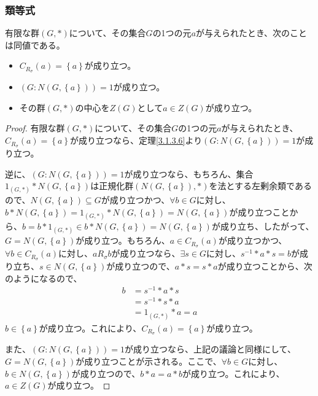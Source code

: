 \documentclass[dvipdfmx]{jsarticle}
\begin{document}
\subsubsection{類等式}%
\begin{thm}\label{3.1.3.7}
有限な群$(G,*)$について、その集合$G$の1つの元$a$が与えられたとき、次のことは同値である。
\begin{itemize}
\item
  $C_{R_{\sigma}}(a) = \left\{ a \right\}$が成り立つ。
\item
  $\left( G:N\left( G,\left\{ a \right\} \right) \right) = 1$が成り立つ。
\item
  その群$(G,*)$の中心を$Z(G)$として$a \in Z(G)$が成り立つ。
\end{itemize}
\end{thm}
\begin{proof}
有限な群$(G,*)$について、その集合$G$の1つの元$a$が与えられたとき、$C_{R_{\sigma}}(a) = \left\{ a \right\}$が成り立つなら、定理\ref{3.1.3.6}より$\left( G:N\left( G,\left\{ a \right\} \right) \right) = 1$が成り立つ。\par
逆に、$\left( G:N\left( G,\left\{ a \right\} \right) \right) = 1$が成り立つなら、もちろん、集合$1_{(G,*)}*N\left( G,\left\{ a \right\} \right)$は正規化群$\left( N\left( G,\left\{ a \right\} \right),* \right)$を法とする左剰余類であるので、$N\left( G,\left\{ a \right\} \right) \subseteq G$が成り立つかつ、$\forall b \in G$に対し、$b*N\left( G,\left\{ a \right\} \right) = 1_{(G,*)}*N\left( G,\left\{ a \right\} \right) = N\left( G,\left\{ a \right\} \right)$が成り立つことから、$b = b*1_{(G,*)} \in b*N\left( G,\left\{ a \right\} \right) = N\left( G,\left\{ a \right\} \right)$が成り立ち、したがって、$G = N\left( G,\left\{ a \right\} \right)$が成り立つ。もちろん、$a \in C_{R_{\sigma}}(a)$が成り立つかつ、$\forall b \in C_{R_{\sigma}}(a)$に対し、$aR_{\sigma}b$が成り立つなら、$\exists s \in G$に対し、$s^{- 1}*a*s = b$が成り立ち、$s \in N\left( G,\left\{ a \right\} \right)$が成り立つので、$a*s = s*a$が成り立つことから、次のようになるので、
\begin{align*}
b &= s^{- 1}*a*s\\
&= s^{- 1}*s*a\\
&= 1_{(G,*)}*a = a
\end{align*}
$b \in \left\{ a \right\}$が成り立つ。これにより、$C_{R_{\sigma}}(a) = \left\{ a \right\}$が成り立つ。\par
また、$\left( G:N\left( G,\left\{ a \right\} \right) \right) = 1$が成り立つなら、上記の議論と同様にして、$G = N\left( G,\left\{ a \right\} \right)$が成り立つことが示される。ここで、$\forall b \in G$に対し、$b \in N\left( G,\left\{ a \right\} \right)$が成り立つので、$b*a = a*b$が成り立つ。これにより、$a \in Z(G)$が成り立つ。\par

\end{proof}
\end{document}
